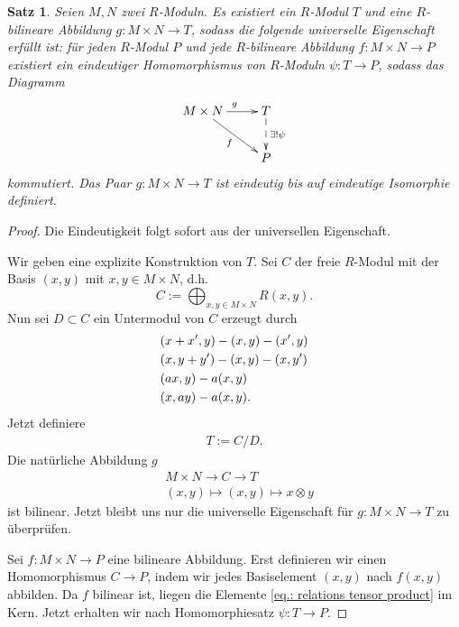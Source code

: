 \documentclass[reqno,12pt]{article}
\numberwithin{equation}{section}
\theoremstyle{plain}
\newtheorem{proposition}[thm]{Satz}
\theoremstyle{definition}
\begin{document}
\begin{proposition}
Seien $M,N$ zwei $R$-Moduln. Es existiert ein $R$-Modul $T$ und eine $R$-bilineare Abbildung $g \colon M \times N \to T$, sodass die folgende universelle Eigenschaft erfüllt ist: für jeden $R$-Modul $P$ und jede $R$-bilineare Abbildung $f \colon M \times N \to P$ existiert ein eindeutiger Homomorphismus von $R$-Moduln $\psi \colon T \to P$, sodass das Diagramm
\begin{align*}
\xymatrix{
M \times N \ar[r]^g \ar[rd]_f & T  \ar@{-->}[d]^{\exists ! \psi} \\
           & P
}
\end{align*}
kommutiert. Das Paar $g \colon M \times N \to T$ ist eindeutig bis auf eindeutige Isomorphie definiert.
\end{proposition}

\begin{proof}
Die Eindeutigkeit folgt sofort aus der universellen Eigenschaft.

\smallskip

 Wir geben eine explizite Konstruktion von $T$. Sei $C$ der freie $R$-Modul mit der Basis $(x,y)$ mit $x,y \in M \times N$, d.h.
\begin{equation*}
C := \bigoplus_{x,y \in M \times N} R (x,y).
\end{equation*}
Nun sei $D \subset C$ ein Untermodul von $C$ erzeugt durch
\begin{align}\label{eq.: relations tensor product} \notag
& (x+x',y) - (x,y) - (x',y) \\ \notag
& (x,y+y') - (x,y) - (x,y') \\
& (ax,y) - a(x,y) \\ \notag
& (x,ay) - a(x,y).
\end{align}
Jetzt definiere
\begin{align*}
T:=C/D.
\end{align*}
Die natürliche Abbildung $g$
\begin{align*}
& M \times N \to C \to T\\
& (x,y) \mapsto (x , y) \mapsto x \otimes y
\end{align*}
ist bilinear. Jetzt bleibt uns nur die universelle Eigenschaft für $g \colon M \times N \to T$ zu überprüfen.

Sei $f \colon M \times N \to P$ eine bilineare Abbildung. Erst definieren wir einen Homomorphismus $C \to P$, indem wir jedes Basiselement $(x,y)$ nach $f(x,y)$ abbilden. Da $f$ bilinear ist, liegen die Elemente \eqref{eq.: relations tensor product} im Kern. Jetzt erhalten wir nach Homomorphiesatz $\psi \colon T \to P$.
\end{proof}
\end{document}
